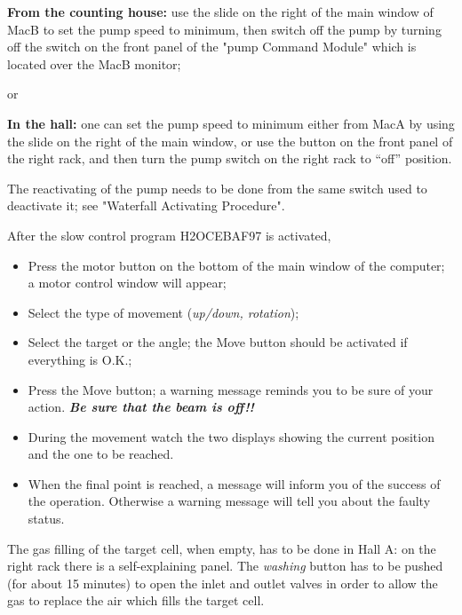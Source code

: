 
{\bf From the counting house:}
use the slide on the right of the main window of MacB 
to set the pump speed to minimum, then switch off the 
pump by turning off the switch on the front panel of   the "pump Command 
Module" which is located over the MacB monitor; 

\centerline{or}

{\bf In the hall:}
one can set the pump speed to minimum either from MacA by using the slide on 
the right of the main window, or use the button on the front panel of the 
right rack, and then turn the pump switch on the right rack to ``off'' 
position.  

The reactivating of the pump needs to be done from the same switch  used
 to deactivate it; see "Waterfall Activating Procedure".  \\


After the slow control program H2OCEBAF97 is activated,

\begin{itemize}
\item Press the motor button on the bottom of the main window of the 
	computer; a motor control window will appear; 
\item Select the type of movement ({\it up/down, rotation});
\item Select the target or the angle; the Move button should be activated if
	everything is O.K.;
\item Press the Move button; a warning message reminds you to be sure of 
	your action. {\bf\sl Be sure that the beam is off!!}
\item During the movement watch the two displays showing the current  
	position and the one to be reached.
\item When the final point is reached, a message will inform you of the 
	success of the operation. Otherwise a warning message will tell you 
	about the faulty status.
\end {itemize}


The gas filling of the target cell, when empty, has to be done in Hall A: 
on the 
right rack there is a self-explaining panel. The {\it washing } 
button has to be 
pushed (for about 15 minutes) to open the inlet and outlet valves in order 
to allow the 
gas to replace the air which fills the target cell.

